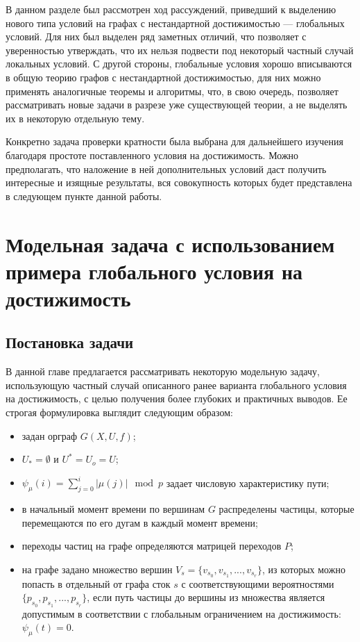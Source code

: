	В данном разделе был рассмотрен ход рассуждений, приведший к выделению нового типа условий на графах с нестандартной достижимостью --- глобальных условий. Для них был выделен ряд заметных отличий, что позволяет с уверенностью утверждать, что их нельзя подвести под некоторый частный случай локальных условий. С другой стороны, глобальные условия хорошо вписываются в общую теорию графов с нестандартной достижимостью, для них можно применять аналогичные теоремы и алгоритмы, что, в свою очередь, позволяет рассматривать новые задачи в разрезе уже существующей теории, а не выделять их в некоторую отдельную тему. 
	
	Конкретно задача проверки кратности была выбрана для дальнейшего изучения благодаря простоте поставленного условия на достижимость. Можно предполагать, что наложение в ней дополнительных условий даст получить интересные и изящные результаты, вся совокупность которых будет представлена в следующем пункте данной работы. 
	
	\chapter{Модельная задача с использованием примера глобального условия на достижимость}
	
	\section{Постановка задачи}
	
	В данной главе предлагается рассматривать некоторую модельную задачу, использующую частный случай описанного ранее варианта глобального условия на достижимость, с целью получения более глубоких и практичных выводов. Ее строгая формулировка выглядит следующим образом:
	
	\begin{itemize}
		\item задан орграф $G(X,U,f)$;
		\item $U_* = \emptyset$ и $U^* = U_o = U$;
		\item $\psi_\mu(i) = \sum_{j=0}^i | \mu(j)| \mod p$ задает числовую характеристику пути; 
		\item в начальный момент времени по вершинам $G$ распределены частицы, которые перемещаются по его дугам в каждый момент времени;
		\item переходы частиц на графе определяются матрицей переходов $P$;
		\item на графе задано множество вершин $V_s = \{v_{s_0}, v_{s_1}, ... , v_{s_r}\}$, из которых можно попасть в отдельный от графа сток $s$ с соответствующими вероятностями $\{p_{s_0}, p_{s_1}, ... , p_{s_r}\}$, если путь частицы до вершины из множества является допустимым в соответствии с глобальным ограничением на достижимость: $\psi_\mu(t) = 0$.
	\end{itemize}

